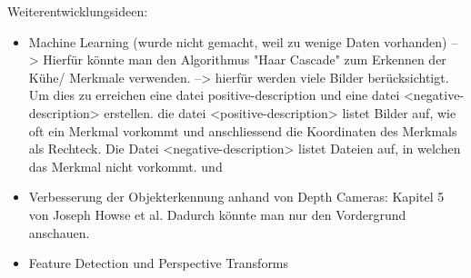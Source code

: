 Weiterentwicklungsideen: 
\begin{itemize}
	\item Machine Learning (wurde nicht gemacht, weil zu wenige Daten vorhanden) --> Hierfür könnte man den Algorithmus "Haar Cascade" zum Erkennen der Kühe/ Merkmale verwenden. --> hierfür werden viele Bilder berücksichtigt. Um dies zu erreichen eine datei positive-description und eine datei <negative-description> erstellen. die datei <positive-description> listet Bilder auf, wie oft ein Merkmal vorkommt und anschliessend die Koordinaten des Merkmals als Rechteck. Die Datei <negative-description> listet Dateien auf, in welchen das Merkmal nicht vorkommt. \citep[S. 75 ff. ]{Howse2016} und \citep[S. 139 ff. ]{Howse2016}
	\item Verbesserung der Objekterkennung anhand von Depth Cameras: Kapitel 5 von Joseph Howse et al. Dadurch könnte man nur den Vordergrund anschauen. \citep[S. 91 ff. ]{Howse2016}
	\item Feature Detection und Perspective Transforms \citep[S. 385 ff. ]{Howse2016}
\end{itemize}